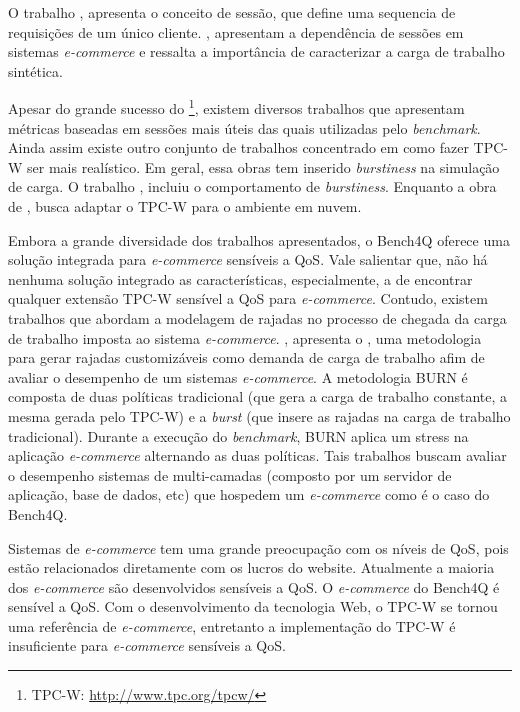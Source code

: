 O trabalho , apresenta o conceito de sessão, que define uma sequencia de requisições de um único cliente. , apresentam a dependência de sessões em sistemas \textit{e-commerce} e ressalta a importância de caracterizar a carga de trabalho sintética.

Apesar do grande sucesso do  \footnote{TPC-W: \url{http://www.tpc.org/tpcw/}}, existem diversos trabalhos que apresentam métricas baseadas em sessões mais úteis das quais utilizadas pelo \textit{benchmark}. Ainda assim existe outro conjunto de trabalhos concentrado em como fazer TPC-W ser mais realístico. Em geral, essa obras tem inserido \textit{burstiness} na simulação de carga. O trabalho , incluiu o comportamento de \textit{burstiness}. Enquanto a obra de , busca adaptar o TPC-W para o ambiente em nuvem.

Embora a grande diversidade dos trabalhos apresentados, o Bench4Q oferece uma solução integrada para \textit{e-commerce} sensíveis a QoS. Vale salientar que, não há nenhuma solução integrado as características, especialmente, a de encontrar qualquer extensão TPC-W sensível a QoS para \textit{e-commerce}. Contudo, existem trabalhos que abordam a modelagem de rajadas no processo de chegada da carga de trabalho imposta ao sistema \textit{e-commerce}. , apresenta o , uma metodologia para gerar rajadas customizáveis como demanda de carga de trabalho afim de avaliar o desempenho de um sistemas \textit{e-commerce}. A metodologia BURN é composta de duas políticas tradicional (que gera a carga de trabalho constante, a mesma gerada pelo TPC-W) e a \textit{burst} (que insere as rajadas na carga de trabalho tradicional). Durante a execução do \textit{benchmark}, BURN aplica um stress na aplicação \textit{e-commerce} alternando as duas políticas. Tais trabalhos buscam avaliar o desempenho sistemas de multi-camadas (composto por um servidor de aplicação, base de dados, etc) que hospedem um \textit{e-commerce} como é o caso do Bench4Q.


Sistemas de \textit{e-commerce} tem uma grande preocupação com os níveis de QoS, pois estão relacionados diretamente com os lucros do website. Atualmente a maioria dos \textit{e-commerce} são desenvolvidos sensíveis a QoS. O \textit{e-commerce} do Bench4Q é sensível a QoS.  Com o desenvolvimento da tecnologia Web, o TPC-W se tornou uma referência de \textit{e-commerce}, entretanto a implementação do TPC-W é insuficiente para \textit{e-commerce} sensíveis a QoS.

